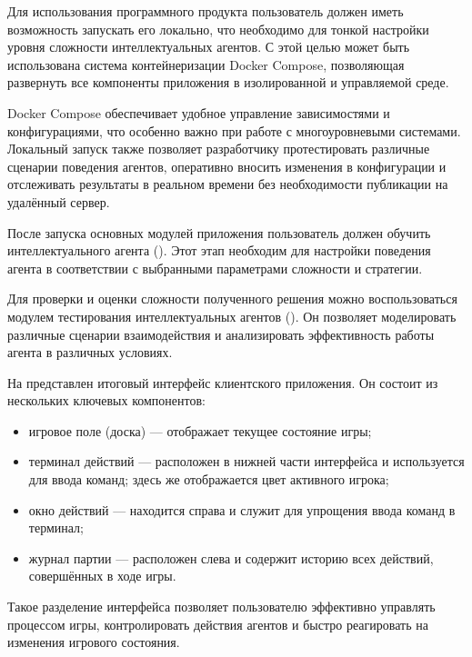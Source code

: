 Для использования программного продукта пользователь должен иметь возможность запускать его локально, что необходимо для тонкой настройки уровня сложности интеллектуальных агентов. С этой целью может быть использована система контейнеризации Docker Compose, позволяющая развернуть все компоненты приложения в изолированной и управляемой среде.

Docker Compose обеспечивает удобное управление зависимостями и конфигурациями, что особенно важно при работе с многоуровневыми системами. Локальный запуск также позволяет разработчику протестировать различные сценарии поведения агентов, оперативно вносить изменения в конфигурации и отслеживать результаты в реальном времени без необходимости публикации на удалённый сервер.

После запуска основных модулей приложения пользователь должен обучить интеллектуального агента (). Этот этап необходим для настройки поведения агента в соответствии с выбранными параметрами сложности и стратегии.


\pagebreak

Для проверки и оценки сложности полученного решения можно воспользоваться модулем тестирования интеллектуальных агентов (). Он позволяет моделировать различные сценарии взаимодействия и анализировать эффективность работы агента в различных условиях.


На  представлен итоговый интерфейс клиентского приложения. Он состоит из нескольких ключевых компонентов:
\begin{itemize}
    \item игровое поле (доска) --- отображает текущее состояние игры;
    \item терминал действий --- расположен в нижней части интерфейса и используется для ввода команд; здесь же отображается цвет активного игрока;
    \item окно действий --- находится справа и служит для упрощения ввода команд в терминал;
    \item журнал партии --- расположен слева и содержит историю всех действий, совершённых в ходе игры.
\end{itemize}

Такое разделение интерфейса позволяет пользователю эффективно управлять процессом игры, контролировать действия агентов и быстро реагировать на изменения игрового состояния.

